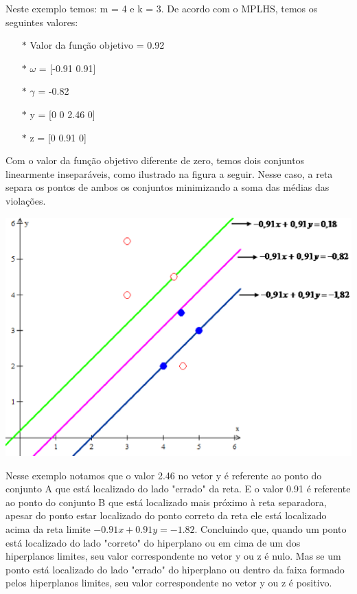 Neste exemplo temos: m = 4 e k = 3. De acordo com o MPLHS, temos os seguintes valores:
\begin{itemize}
\item[$\ast$] Valor da função objetivo = 0.92
\item[$\ast$] $\omega$ = [-0.91  0.91]
\item[$\ast$] $\gamma$ = -0.82
\item[$\ast$] y = [0 0 2.46 0]
\item[$\ast$] z = [0 0.91 0]
\end{itemize}

Com o valor da função objetivo diferente de zero, temos dois conjuntos linearmente inseparáveis, como ilustrado na figura a seguir. Nesse caso, a reta separa os pontos de ambos os conjuntos minimizando a soma das médias das violações.

\begin{center}
	\includegraphics[scale=0.5]{graficos/exemplo1}
	\label{img:ex2}
\end{center}

Nesse exemplo notamos que o valor 2.46 no vetor y é referente ao ponto do conjunto A que está localizado do lado "errado" da reta. E o valor 0.91 é referente ao ponto do conjunto B que está localizado mais próximo à reta separadora, apesar do ponto estar localizado do ponto correto da reta ele está localizado acima da reta limite $-0.91x + 0.91y = -1.82$. Concluindo que, quando um ponto está localizado do lado "correto" do hiperplano ou em cima de um dos hiperplanos limites, seu valor correspondente no vetor y ou z é nulo. Mas se um ponto está localizado do lado "errado" do hiperplano ou dentro da faixa formado pelos hiperplanos limites, seu valor correspondente no vetor y ou z é positivo.

